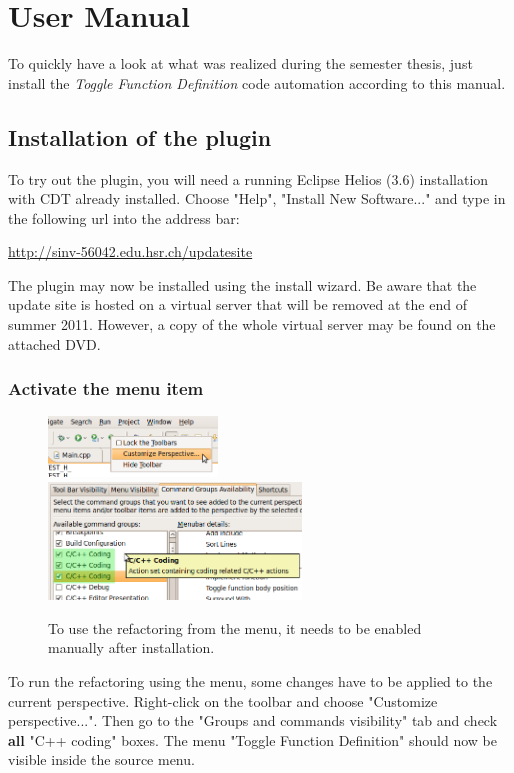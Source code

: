 \chapter{User Manual}
\thispagestyle{fancy}

To quickly have a look at what was realized during the semester thesis, just 
install the \textit{Toggle Function Definition} code automation according to 
this manual.

\section{Installation of the plugin}

To try out the plugin, you will need a running Eclipse Helios (3.6) installation with CDT already installed. Choose "Help", "Install New Software..." and type in the following url into the address bar:

\url{http://sinv-56042.edu.hsr.ch/updatesite}

The plugin may now be installed using the install wizard. Be aware that the 
update site is hosted on a virtual server that will be removed at the end of 
summer 2011. However, a copy of the whole virtual server may be found on the 
attached DVD.

\subsection{Activate the menu item}

\begin{figure}[h]
\includegraphics[width=0.4\textwidth]{images/customizeperspective.png}
\includegraphics[width=0.6\textwidth]{images/commandgroups.png}
\caption{To use the refactoring from the menu, it needs to be enabled manually 
after installation.}
\label{showMenu}
\end{figure}
To run the refactoring using the menu, some changes have to be applied to the 
current perspective. Right-click on the toolbar and choose 
"Customize perspective...". Then go to the "Groups and commands visibility" tab 
and check \textbf{all} "C++ coding" boxes. The menu "Toggle Function Definition" 
should now be visible inside the source menu.

